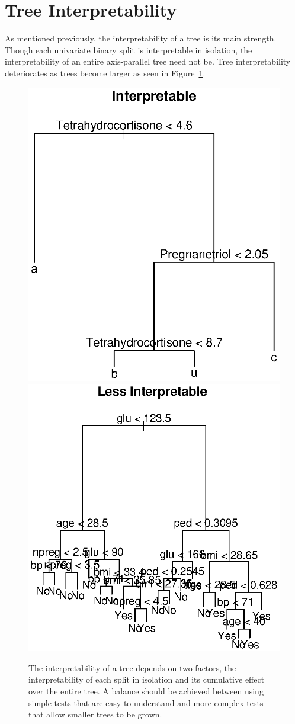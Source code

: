 \section{Tree Interpretability}
\label{TreeInterpretability}
As mentioned previously, the interpretability of a tree is its main strength. Though each univariate binary split is interpretable in isolation, the interpretability of an entire axis-parallel tree need not be. Tree interpretability deteriorates as trees become larger as seen in Figure~\ref{fig_tree_interpretability}.\\
\begin{figure}
\centering
\includegraphics[width=.49\textwidth]{fig_tree_interpretability_more.ps}
\includegraphics[width=.49\textwidth]{fig_tree_interpretability_less.ps}
\caption{The interpretability of a tree depends on two factors, the interpretability of each split in isolation and its cumulative effect over the entire tree. A balance should be achieved between using simple tests that are easy to understand and more complex tests that allow smaller trees to be grown.}
\label{fig_tree_interpretability}
\end{figure}

